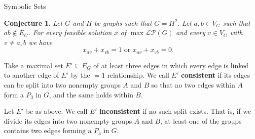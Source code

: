 \documentclass[10pt]{beamer}
\newtheorem{conjecture}{Conjecture}
\begin{document}
\begin{frame}{Symbolic Sets}
    \scriptsize
    \begin{conjecture} \label{conjecture::two_edges_linear_maximization}
        Let $G$ and $H$ be graphs such that $G = H^2$. Let $a,b \in V_G$ such that $ab \notin E_G$. For every feasible solution $x$ of $\max \mathcal{LP}(G)$ and every $v \in V_G$ with $v \neq a,b$ we have
        \[
        x_{av} + x_{vb} = 1 \text{ or }  x_{av} + x_{vb} = 0.
        \]
    \end{conjecture}

    \begin{definition} \label{def::consistent_set}
        Take a maximal set $E'\subseteq E_G$ of at least three edges in which every edge is
        linked to another edge of $E'$ by the $=1$ relationship. We call $E'$
        \textbf{consistent} if its edges can be split into two nonempty groups $A$ and $B$
        so that no two edges within $A$ form a $P_3$ in $G$, and the same holds within $B$.
    \end{definition}

    \begin{definition} \label{def::inconsistent_set}
        Let $E'$ be as above. We call $E'$ \textbf{inconsistent} if no such split exists. That is, if we divide its edges into two nonempty groups $A$ and $B$, at least one of the groups contains two edges forming a $P_3$ in $G$.
    \end{definition}
\end{frame}
\end{document}
